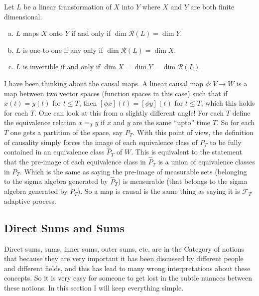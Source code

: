  
 

 
 
 
 \begin{summary}
 	Let $ L $ be a linear transformation of $ X $ into $ Y $ where $ X $ and $ Y $ are both finite dimensional.
 	\begin{enumerate}[(a)]
 		\item $ L $ maps $ X $ onto $ Y $ if and only if $ \dim \mathcal{R}(L) = \dim Y $.
 		\item $ L $ is one-to-one if any only if $ \dim \mathcal{R}(L) = \dim X $.
 		\item $ L $ is invertible if and only if $ \dim X = \dim Y = \dim \mathcal{R}(L) $.
 	\end{enumerate}
 \end{summary}
 
 
 \begin{summary}
 	I have been thinking about the causal maps. A linear causal map $ \phi: V\to W $ is a map between two vector spaces (function spaces in this case) such that if $ x(t) = y(t) $ for $ t\leq T $, then $ [\phi x](t) = [\phi y](t) $ for $ t\leq T $, which this holds for each $ T $. One can look at this from a slightly different angle! For each $ T $ define the equivalence relation $ x =_T y $ if $ x $ and $ y $ are the same ``upto'' time $ T $. So for each $ T $ one gets a partition of the space, say $ P_T $. With this point of view, the definition of causality simply forces the image of each equivalence class of $ P_T $ to be fully contained in an equivalence class $ \hat{P}_T $ of $ W $. This is equivalent to the statement that the pre-image of each equivalence class in $ \hat{P}_T $ is a union of equivalence classes in $ P_T $. Which is the same as saying the pre-image of measurable sets (belonging to the sigma algebra generated by $ \hat{P}_T $) is measurable (that belongs to the sigma algebra generated by $ P_T $). So a map is causal is the same thing as saying it is $ \mathcal{F}_T $ adaptive process.
 \end{summary}
 
 
 
 \subsection{Direct Sums and Sums}
 Direct sums, sums, inner sums, outer sums, etc, are in the Category of notions that because they are very important it has been discussed by different people and different fields, and this has lead to many wrong interpretations about these concepts. So it is very easy for someone to get lost in the subtle nuances between these notions. In this section I will keep everything simple.
 
